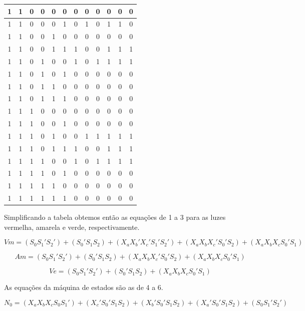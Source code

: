 \documentclass[12pt,a4paper]{article}
\begin{document}
\begin{longtable}{|ccc|ccc||ccc|c|c|c|}
1 & 1 & 0 & 0 & 0 & 0 & 0 & 0 & 0 & 0 & 0 & 0 \\ \hline
1 & 1 & 0 & 0 & 0 & 1 & 0 & 1 & 0 & 1 & 1 & 0 \\ \hline
1 & 1 & 0 & 0 & 1 & 0 & 0 & 0 & 0 & 0 & 0 & 0 \\ \hline
1 & 1 & 0 & 0 & 1 & 1 & 1 & 0 & 0 & 1 & 1 & 1 \\ \hline
1 & 1 & 0 & 1 & 0 & 0 & 1 & 0 & 1 & 1 & 1 & 1 \\ \hline
1 & 1 & 0 & 1 & 0 & 1 & 0 & 0 & 0 & 0 & 0 & 0 \\ \hline
1 & 1 & 0 & 1 & 1 & 0 & 0 & 0 & 0 & 0 & 0 & 0 \\ \hline
1 & 1 & 0 & 1 & 1 & 1 & 0 & 0 & 0 & 0 & 0 & 0 \\ \hline
1 & 1 & 1 & 0 & 0 & 0 & 0 & 0 & 0 & 0 & 0 & 0 \\ \hline
1 & 1 & 1 & 0 & 0 & 1 & 0 & 0 & 0 & 0 & 0 & 0 \\ \hline
1 & 1 & 1 & 0 & 1 & 0 & 0 & 1 & 1 & 1 & 1 & 1 \\ \hline
1 & 1 & 1 & 0 & 1 & 1 & 1 & 0 & 0 & 1 & 1 & 1 \\ \hline
1 & 1 & 1 & 1 & 0 & 0 & 1 & 0 & 1 & 1 & 1 & 1 \\ \hline
1 & 1 & 1 & 1 & 0 & 1 & 0 & 0 & 0 & 0 & 0 & 0 \\ \hline
1 & 1 & 1 & 1 & 1 & 0 & 0 & 0 & 0 & 0 & 0 & 0 \\ \hline
1 & 1 & 1 & 1 & 1 & 1 & 0 & 0 & 0 & 0 & 0 & 0 \\ \hline
\end{longtable}

Simplificando a tabela obtemos então as equações de 1 a 3 para as luzes vermelha, amarela e verde, respectivamente.

\begin{equation}
Vm=(S_0S_1'S_2')+(S_0'S_1S_2)+(X_aX_b'X_c'S_1'S_2')+(X_aX_bX_c'S_0'S_2)+(X_aX_bX_cS_0'S_1)
\end{equation}

\begin{equation}
Am=(S_0S_1'S_2')+(S_0'S_1S_2)+(X_aX_bX_c'S_0'S_2)+(X_aX_bX_cS_0'S_1)
\end{equation}

\begin{equation}
Ve=(S_0S_1'S_2')+(S_0'S_1S_2)+(X_aX_bX_cS_0'S_1)
\end{equation}

As equações da máquina de estados são as de 4 a 6.

\begin{equation}
N_0=(X_aX_bX_cS_0S_1')+(X_c'S_0'S_1S_2)+(X_b'S_0'S_1S_2)+(X_a'S_0'S_1S_2)+(S_0S_1'S_2')
\end{equation}
\end{document}
